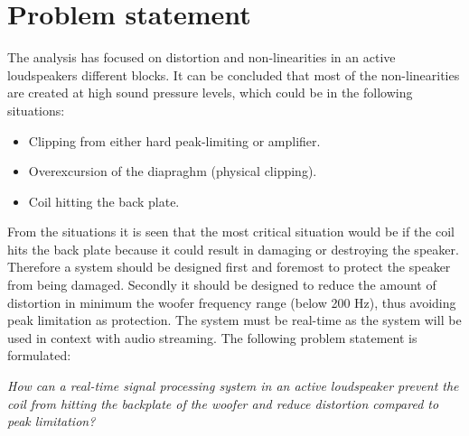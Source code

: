 





%

%

%

%

%

\section{Problem statement} \label{sec:problem_statement}
The analysis has focused on distortion and non-linearities in an active loudspeakers different blocks. It can be concluded that most of the non-linearities are created at high sound pressure levels, which could be in the following situations:
\begin{itemize}
\item Clipping from either hard peak-limiting or amplifier.
\item Overexcursion of the diapraghm (physical clipping). 
\item Coil hitting the back plate. 
\end{itemize}

From the situations it is seen that the most critical situation would be if the coil hits the back plate because it could result in damaging or destroying the speaker. Therefore a system should be designed first and foremost to protect the speaker from being damaged. Secondly it should be designed to reduce the amount of distortion in minimum the woofer frequency range (below 200 Hz), thus avoiding peak limitation as protection. The system must be real-time as the system will be used in context with audio streaming. The following problem statement is formulated:

\begin{center}
\label{ProblemStatement}
\textit{How can a real-time signal processing system in an active loudspeaker prevent the coil from hitting the backplate of the woofer and reduce distortion compared to peak limitation?}
\end{center}

